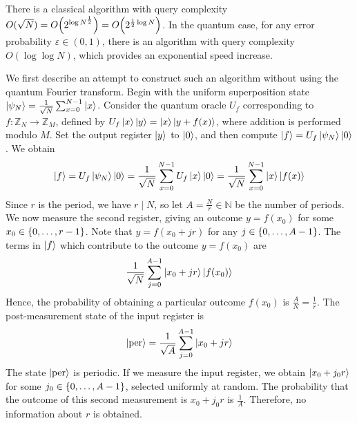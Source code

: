 There is a classical algorithm with query complexity \( O(\sqrt{N}) = O\qty(2^{\log N^{\frac{1}{2}}}) = O\qty(2^{\frac{1}{2} \log N}) \).
In the quantum case, for any error probability \( \varepsilon \in (0,1) \), there is an algorithm with query complexity \( O(\log \log N) \), which provides an exponential speed increase.

We first describe an attempt to construct such an algorithm without using the quantum Fourier transform.
Begin with the uniform superposition state \( \ket{\psi_N} = \frac{1}{\sqrt{N}} \sum_{x=0}^{N-1} \ket{x} \).
Consider the quantum oracle \( U_f \) corresponding to \( f \colon \mathbb Z_N \to \mathbb Z_M \), defined by \( U_f \ket{x} \ket{y} = \ket{x} \ket{y + f(x)} \), where addition is performed modulo \( M \).
Set the output register \( \ket{y} \) to \( \ket{0} \), and then compute \( \ket{f} = U_f \ket{\psi_N} \ket{0} \).
We obtain
\[ \ket{f} = U_f \ket{\psi_N} \ket{0} = \frac{1}{\sqrt{N}} \sum_{x=0}^{N-1} U_f \ket{x} \ket{0} = \frac{1}{\sqrt{N}} \sum_{x=0}^{N-1} \ket{x} \ket{f(x)} \]
Since \( r \) is the period, we have \( r \mid N \), so let \( A = \frac{N}{r} \in \mathbb N \) be the number of periods.
We now measure the second register, giving an outcome \( y = f(x_0) \) for some \( x_0 \in \qty{0, \dots, r-1} \).
Note that \( y = f(x_0 + jr) \) for any \( j \in \qty{0, \dots, A-1} \).
The terms in \( \ket{f} \) which contribute to the outcome \( y = f(x_0) \) are
\[ \frac{1}{\sqrt{N}} \sum_{j=0}^{A-1} \ket{x_0 + jr} \ket{f(x_0)} \]
Hence, the probability of obtaining a particular outcome \( f(x_0) \) is \( \frac{A}{N} = \frac{1}{r} \).
The post-measurement state of the input register is
\[ \ket{\text{per}} = \frac{1}{\sqrt{A}} \sum_{j=0}^{A-1} \ket{x_0 + jr} \]
The state \( \ket{\text{per}} \) is periodic.
If we measure the input register, we obtain \( \ket{x_0 + j_0 r} \) for some \( j_0 \in \qty{0, \dots, A-1} \), selected uniformly at random.
The probability that the outcome of this second measurement is \( x_0 + j_0 r \) is \( \frac{1}{A} \).
Therefore, no information about \( r \) is obtained.

